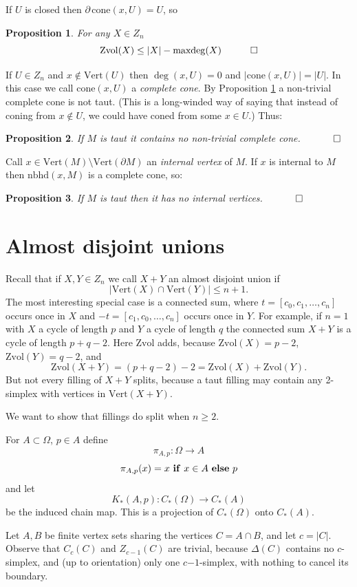\documentclass[12pt]{article}
\newtheorem{prop}{Proposition}
\newcommand{\mathproofend}{\quad \qed}
\newcommand{\proofend}{$\quad \qed$}
\def\del{\partial}
\newcommand{\kw}{\mathrm}
\newcommand{\cone}{\kw{cone}}
\newcommand{\maxdeg}{\kw{maxdeg}}
\newcommand{\vertices}{\kw{Vert}}
\newcommand{\nbhd}{\kw{nbhd}}
\newcommand{\Zvol}{\kw{Zvol}}
\newcommand{\kwstyle}{\bf}
\newcommand{\IF}{{\ \kwstyle{if}\ }}
\newcommand{\ELSE}{{\ \kwstyle{else}\ }}
\newcommand{\mns}{\mathord{-}}
\begin{document}
If $U$ is closed then
$\del\, \cone(x,U) = U$, so

\begin{prop} \label{maxdeg}
For any $X \in Z_n$
\[
\Zvol(X) \leq |X| - \maxdeg(X)
\mathproofend
\]
\end{prop}

If $U \in Z_n$ and $x \notin \vertices(U)$ then
$\deg(x,U)=0$ and
$|\cone(x,U)| = |U|$.
In this case we call $\cone(x,U)$ a \emph{complete cone}.
By Proposition \ref{maxdeg} a non-trivial complete cone is not taut.
(This is a long-winded way of saying that instead of coning from
$x \notin U$, we could have coned from some $x \in U$.)
Thus:
\begin{prop}\label{nocone}
If $M$ is taut it contains no non-trivial complete cone.
\proofend
\end{prop}

Call $x \in \vertices(M) \setminus \vertices(\del M)$ an
\emph{internal vertex} of $M$.
If $x$ is internal to $M$ then $\nbhd(x,M)$ is a complete cone, so:
\begin{prop} \label{nointernal}
If $M$ is taut then
it has no internal vertices.
\proofend
\end{prop}

\section{Almost disjoint unions}

Recall that if $X,Y \in Z_n$ we call $X+Y$ an almost disjoint union
if
\[
|\vertices(X) \cap \vertices(Y)| \leq n+1
.\]
The most interesting special case is a connected sum,
where $t=[c_0,c_1,\ldots,c_n]$ occurs once in $X$ and
$-t=[c_1,c_0,\ldots,c_n]$ occurs once in $Y$.
For example, if $n=1$ with $X$ a cycle of length $p$
and $Y$ a cycle of length $q$
the connected sum $X+Y$ is
a cycle of length $p+q-2$.
Here
$\Zvol$ adds, because
$\Zvol(X)=p-2$,
$\Zvol(Y) = q-2$,
and
\[
\Zvol(X+Y) = (p+q-2)-2 = \Zvol(X)+\Zvol(Y)
.
\]
But not every filling of $X+Y$ splits, because a taut filling
may contain any 2-simplex with vertices in $\vertices(X+Y)$.

We want to show that fillings do split when $n \geq 2$.

For $A \subset \Omega$, $p \in A$ define
\[
\pi_{A,p}: \Omega \to A
\]
\[
\pi_{A,p}(x) = x \IF x \in A \ELSE p
\]
and let
\[
K_*(A,p): C_*(\Omega) \to C_*(A)
\]
be the induced chain map.
This is a projection of $C_*(\Omega)$ onto $C_*(A)$.

Let $A,B$ be finite vertex sets sharing the vertices
$C = A \cap B$,
and let $c=|C|$.
Observe that
$C_c(C)$ and $Z_{c-1}(C)$ are trivial,
because $\Delta(C)$ contains no $c$-simplex,
and (up to orientation) only one $c\mns 1$-simplex,
with nothing to cancel its boundary.
\end{document}
